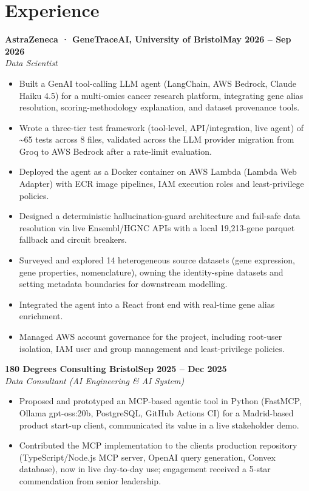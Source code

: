 \documentclass[a4paper,11pt]{article}
\newcommand{\entry}[4]{\needspace{4\baselineskip}\noindent\textbf{#1}\hfill\textbf{#2}\\ \textit{#3}\hfill\textit{#4}\par}
\begin{document}
\section{Experience}
\entry{AstraZeneca · GeneTraceAI, University of Bristol}{May 2026 – Sep 2026}{Data Scientist}{}
\begin{itemize}
  \item Built a GenAI tool-calling LLM agent (LangChain, AWS Bedrock, Claude Haiku 4.5) for a multi-omics cancer research platform, integrating gene alias resolution, scoring-methodology explanation, and dataset provenance tools.
  \item Wrote a three-tier test framework (tool-level, API/integration, live agent) of \textasciitilde{}65 tests across 8 files, validated across the LLM provider migration from Groq to AWS Bedrock after a rate-limit evaluation.
  \item Deployed the agent as a Docker container on AWS Lambda (Lambda Web Adapter) with ECR image pipelines, IAM execution roles and least-privilege policies.
  \item Designed a deterministic hallucination-guard architecture and fail-safe data resolution via live Ensembl/HGNC APIs with a local 19,213-gene parquet fallback and circuit breakers.
  \item Surveyed and explored 14 heterogeneous source datasets (gene expression, gene properties, nomenclature), owning the identity-spine datasets and setting metadata boundaries for downstream modelling.
  \item Integrated the agent into a React front end with real-time gene alias enrichment.
  \item Managed AWS account governance for the project, including root-user isolation, IAM user and group management and least-privilege policies.
\end{itemize}
\vspace{4pt}
\entry{180 Degrees Consulting Bristol}{Sep 2025 – Dec 2025}{Data Consultant (AI Engineering \& AI System)}{}
\begin{itemize}
  \item Proposed and prototyped an MCP-based agentic tool in Python (FastMCP, Ollama gpt-oss:20b, PostgreSQL, GitHub Actions CI) for a Madrid-based product start-up client, communicated its value in a live stakeholder demo.
  \item Contributed the MCP implementation to the client\textquotesingle{}s production repository (TypeScript/Node.js MCP server, OpenAI query generation, Convex database), now in live day-to-day use; engagement received a 5-star commendation from senior leadership.
\end{itemize}
\end{document}
